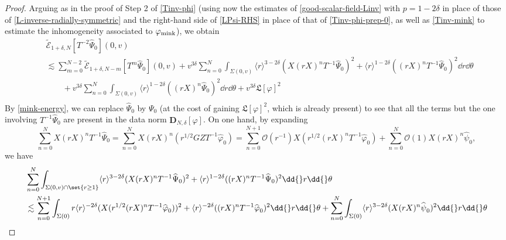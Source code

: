 \documentclass[10pt, reqno]{amsart}
\begin{document}
\begin{proof}
 Arguing as in the proof of Step 2 of \cref{Tinv-phi} (using now
the estimates of \cref{good-scalar-field-Linv} with \(p = 1-2\delta{}\) in place of
those of \cref{L-inverse-radially-symmetric} and the right-hand side of \cref{LPsi-RHS} in place
of that of \cref{Tinv-phi-prep-0}, as well as \cref{Tinv-mink} to estimate the
inhomogeneity associated to \(\varphi{}_{\textnormal{mink}}\)), we obtain
\begin{equation}
\begin{split}
&\tilde{\mathcal{E}}_{1+\delta{},N}[T^{-2}\widehat{\Psi{}}_0](0,v) \\
&\lesssim \sum_{m=0}^{N-2} \tilde{\mathcal{E}}_{1+\delta{},N-m}[T^m\widehat{\Psi{}}_0](0,v)  + v^{3\delta{}}\sum_{n=0}^N \int _{\Sigma{}(0,v)} \langle{}r\rangle^{3-2\delta{}}(X(rX)^nT^{-1}\widehat{\Psi{}}_0)^2 + \langle{}r\rangle^{1-2\delta{}}((rX)^nT^{-1}\widehat{\Psi{}}_0)^2 \dd{}r\dd{}\theta{}\\
&\qquad + v^{3\delta{}}\sum_{n=0}^N \int _{\Sigma{}(0,v)} \langle{}r\rangle^{1-2\delta{}}((rX)^n\widehat{\Psi{}}_0)^2 \dd{}r\dd{}\theta{} + v^{3\delta{}}\mathfrak{L}[\varphi{}]^2\\
\end{split}
\end{equation}
By \cref{mink-energy}, we can replace \(\widehat{\Psi{}}_0\) by \(\Psi_{0}\) (at the cost
of gaining \(\mathfrak{L}[\varphi{}]^2\), which is already present) to see that all the
terms but the one involving \(T^{-1}\widehat{\Psi{}}_0\) are present in the data norm
\(\mathbf{D}_{N,\delta{}}[\varphi{}]\). On one hand, by expanding
\begin{equation}
\sum_{n=0}^NX(rX)^nT^{-1}\widehat{\Psi{}}_0 = \sum_{n=0}^NX(rX)^n(r^{1/2}GZT^{-1}\widehat{\varphi{}}_0) = \sum_{n=0}^{N+1}\mathcal{O}(r^{-1})X(r^{1/2}(rX)^{n}T^{-1}\widehat{\varphi{}}_0) + \sum_{n=0}^N\mathcal{O}(1)X(rX)^n\widehat{\psi{}}_{0},
\end{equation}
we have
\begin{equation}\label{Tinv-Psi-prep0}
\begin{split}
&\sum_{n=0}^N\int _{\Sigma{}(0,v)\cap \set{r\ge 1}} \langle{}r\rangle^{3-2\delta{}}(X(rX)^nT^{-1}\widehat{\Psi{}}_0)^2 + \langle{}r\rangle^{1-2\delta{}}((rX)^nT^{-1}\widehat{\Psi{}}_0)^2 \dd{}r\dd{}\theta{} \\
&\lesssim \sum_{n=0}^{N+1}\int _{\Sigma{}(0)} r\langle{}r\rangle^{-2\delta{}}(X(r^{1/2}(rX)^nT^{-1}\widehat{\varphi{}}_0))^2 + \langle{}r\rangle^{-2\delta{}}((rX)^nT^{-1}\widehat{\varphi{}}_0)^2 \dd{}r\dd{}\theta{} + \sum_{n=0}^{N}\int _{\Sigma{}(0)}\langle{}r\rangle^{3-2\delta{}}(X(rX)^n\widehat{\psi{}}_{0})^2 \dd{}r\dd{}\theta{} \\

\end{split}
\end{equation}
\end{proof}
\end{document}
